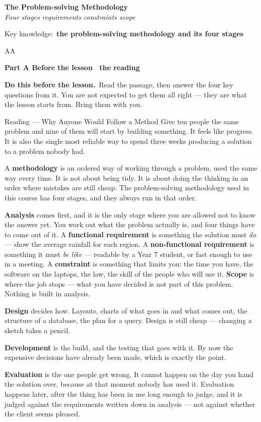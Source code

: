 \documentclass[11pt,a4paper]{article}
\newcommand{\sectiondiv}[2]{%
  \needspace{5\baselineskip}%
  \refstepcounter{section}%
  \begin{tcolorbox}[
    enhanced, breakable=false, arc=3.5mm,
    colback=NavyBlue, colframe=NavyBlue, boxrule=0pt,
    sidebyside, sidebyside align=center,
    lefthand width=2.0cm,
    left=2mm, right=4mm, top=4mm, bottom=4mm
  ]
    \begin{center}
      {\headingfont\bfseries\color{white!35!NavyBlue}\fontsize{50}{50}\selectfont \thesection}
    \end{center}
    \tcblower
    {\headingfont\bfseries\color{white}\LARGE #1}\\[3pt]
    {\itshape\color{white!75!NavyBlue}\small #2}
  \end{tcolorbox}%
}
\newcommand{\lessonpart}[3]{%
  \par\if#1A\needspace{12\baselineskip}\vspace{6pt}\else\notesfill\clearpage\fi
  \begin{tcolorbox}[enhanced, breakable=false, arc=2mm, boxrule=0pt,
    colback=#3!14, borderline west={4pt}{0pt}{#3},
    left=4mm, right=3mm, top=1.6mm, bottom=1.6mm]
  {\headingfont\bfseries\color{#3!60!black}\large Part #1 \textbullet{} #2}
  \end{tcolorbox}\vspace{2pt}}
\newcommand{\lessoncodes}[1]{%
  {\small\headingfont\color{DarkGrey}Key knowledge:\ \textbf{#1}}\par\vspace{4pt}}
\newcommand{\notesfill}{\par
  \ifdim\dimexpr\pagegoal-\pagetotal\relax>3.2cm
    \vspace*{\fill}%
    \begin{tcolorbox}[enhanced, breakable=false, arc=2mm, colback=Paper, colframe=Line,
      left=2mm, right=2mm, top=1mm, bottom=1mm, boxrule=1pt,
      height=\dimexpr\pagegoal-\pagetotal-1.0cm\relax]
      {\small\headingfont\color{DarkGrey}Notes}
    \end{tcolorbox}%
  \fi}
\newcommand{\beforelesson}{%
  \begin{tcolorbox}[enhanced, breakable=false, arc=2mm, boxrule=0.5pt,
    colback=LightGreen, colframe=Teal!45,
    left=4mm, right=3.5mm, top=2mm, bottom=2mm]
  {\headingfont\bfseries\color{TealGreen}Do this before the lesson.}\ Read the passage,
  then answer the four key questions from it. You are not expected to get them all
  right --- they are what the lesson starts from. Bring them with you.
  \end{tcolorbox}\vspace{2pt}}
\begin{document}
\clearpage
\sectiondiv{The Problem-solving Methodology}{Four stages \textbullet{} requirements \textbullet{} constraints \textbullet{} scope}\label{sec:1}
\lessoncodes{the problem-solving methodology and its four stages}

\lessonpart{A}{Before the lesson \textemdash\ the reading}{Teal}\label{pre:1}
\beforelesson

\begin{readingbox}{Reading --- Why Anyone Would Follow a Method}
Give ten people the same problem and nine of them will start by building something. It feels like progress. It is also the single most reliable way to spend three weeks producing a solution to a problem nobody had.

A \textbf{methodology} is an ordered way of working through a problem, used the same way every time. It is not about being tidy. It is about doing the thinking in an order where mistakes are still cheap. The problem-solving methodology used in this course has four stages, and they always run in that order.

\textbf{Analysis} comes first, and it is the only stage where you are allowed not to know the answer yet. You work out what the problem actually is, and four things have to come out of it. A \textbf{functional requirement} is something the solution must \emph{do} --- show the average rainfall for each region. A \textbf{non-functional requirement} is something it must \emph{be like} --- readable by a Year 7 student, or fast enough to use in a meeting. A \textbf{constraint} is something that limits you: the time you have, the software on the laptops, the law, the skill of the people who will use it. \textbf{Scope} is where the job stops --- what you have decided is not part of this problem. Nothing is built in analysis.

\textbf{Design} decides how. Layouts, charts of what goes in and what comes out, the structure of a database, the plan for a query. Design is still cheap --- changing a sketch takes a pencil.

\textbf{Development} is the build, and the testing that goes with it. By now the expensive decisions have already been made, which is exactly the point.

\textbf{Evaluation} is the one people get wrong. It cannot happen on the day you hand the solution over, because at that moment nobody has used it. Evaluation happens later, after the thing has been in use long enough to judge, and it is judged against the requirements written down in analysis --- not against whether the client seems pleased.


\end{readingbox}
\end{document}
